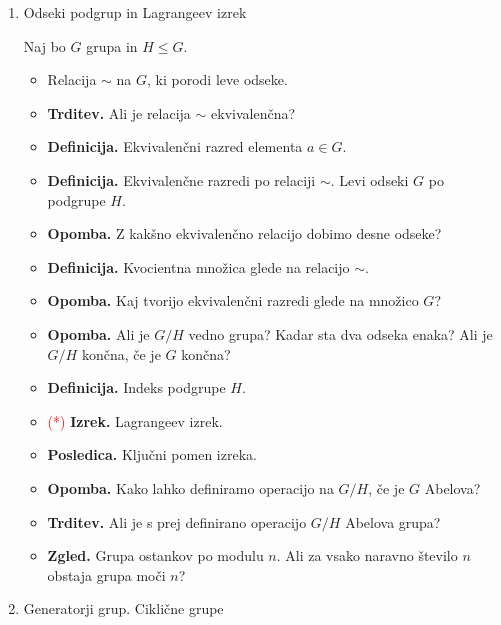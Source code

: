 \begin{enumerate}
    \item Odseki podgrup in Lagrangeev izrek
    
    Naj bo \(G\) grupa in \(H \leq G\).
    \begin{itemize}
        \item Relacija \(\sim\) na \(G\), ki porodi leve odseke.
        \item \textbf{Trditev.} Ali je relacija \(\sim\) ekvivalenčna?
        \item \textbf{Definicija.} Ekvivalenčni razred elementa \(a \in G\).
        \item \textbf{Definicija.} Ekvivalenčne razredi po relaciji \(\sim\). Levi odseki \(G\) po podgrupe \(H\).
        \item \textbf{Opomba.} Z kakšno ekvivalenčno relacijo dobimo desne odseke?
        \item \textbf{Definicija.} Kvocientna množica glede na relacijo \(\sim\).
        \item \textbf{Opomba.} Kaj tvorijo ekvivalenčni razredi glede na množico \(G\)?
        \item \textbf{Opomba.} Ali je \(G/H\) vedno grupa? Kadar sta dva odseka enaka? Ali je \(G/H\) končna, če je \(G\) končna?
        \item \textbf{Definicija.} Indeks podgrupe \(H\).
        \item \textcolor{red}{(*)} \textbf{Izrek.} Lagrangeev izrek.
        \item \textbf{Posledica.} Ključni pomen izreka.
        \item \textbf{Opomba.} Kako lahko definiramo operacijo na \(G/H\), če je \(G\) Abelova?
        \item \textbf{Trditev.} Ali je s prej definirano operacijo \(G/H\) Abelova grupa?
        \item \textbf{Zgled.} Grupa ostankov po modulu \(n\). Ali za vsako naravno število \(n\) obstaja grupa moči \(n\)?
    \end{itemize}

    \item Generatorji grup. Ciklične grupe
    

\end{enumerate}
